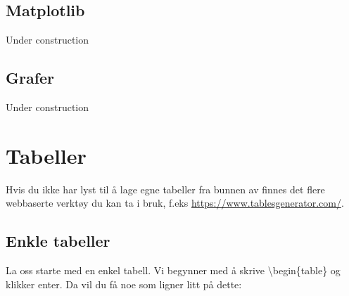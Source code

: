     \subsection{Matplotlib}
        Under construction
    \subsection{Grafer}
        Under construction
    

\section{Tabeller}
    Hvis du ikke har lyst til å lage egne tabeller fra bunnen av finnes det flere webbaserte verktøy du kan ta i bruk, f.eks \url{https://www.tablesgenerator.com/}.
    
    \subsection{Enkle tabeller}
    
        La oss starte med en enkel tabell. Vi begynner med å skrive \textbackslash begin\{table\} og klikker enter. Da vil du få noe som ligner litt på dette:
        
